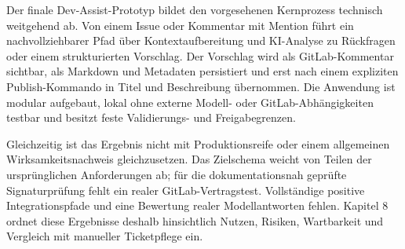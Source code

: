 Der finale Dev-Assist-Prototyp bildet den vorgesehenen Kernprozess technisch weitgehend ab. Von einem Issue oder Kommentar mit Mention führt ein nachvollziehbarer Pfad über Kontextaufbereitung und KI-Analyse zu Rückfragen oder einem strukturierten Vorschlag. Der Vorschlag wird als GitLab-Kommentar sichtbar, als Markdown und Metadaten persistiert und erst nach einem expliziten Publish-Kommando in Titel und Beschreibung übernommen. Die Anwendung ist modular aufgebaut, lokal ohne externe Modell- oder GitLab-Abhängigkeiten testbar und besitzt feste Validierungs- und Freigabegrenzen.

Gleichzeitig ist das Ergebnis nicht mit Produktionsreife oder einem allgemeinen Wirksamkeitsnachweis gleichzusetzen. Das Zielschema weicht von Teilen der ursprünglichen Anforderungen ab; für die dokumentationsnah geprüfte Signaturprüfung fehlt ein realer GitLab-Vertragstest. Vollständige positive Integrationspfade und eine Bewertung realer Modellantworten fehlen. Kapitel 8 ordnet diese Ergebnisse deshalb hinsichtlich Nutzen, Risiken, Wartbarkeit und Vergleich mit manueller Ticketpflege ein.

\endinput
\clearpage
\section*{Quellen zu Kapitel 7}

GitLab Docs o. J.a. Webhooks. \url{https://docs.gitlab.com/user/project/integrations/webhooks/} (Zugriff vom 21.07.2026).

GitLab Docs o. J.c. Issues API. \url{https://docs.gitlab.com/api/issues/} (Zugriff vom 25.06.2026).

GitLab Docs o. J.d. Notes API. \url{https://docs.gitlab.com/api/notes/} (Zugriff vom 25.06.2026).

OpenCode Docs o. J.a. Agents. \url{https://opencode.ai/docs/agents/} (Zugriff vom 25.06.2026).

OpenCode Docs o. J.d. CLI. \url{https://opencode.ai/docs/cli/} (Zugriff vom 08.07.2026).


